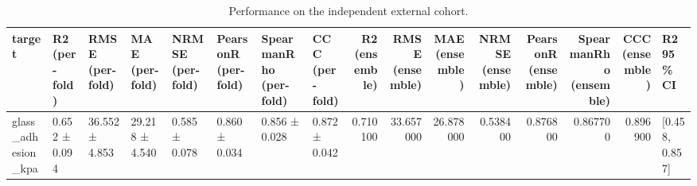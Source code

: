 \begin{table}
\caption{Performance on the independent external cohort.}
\label{tab:external_validation}
\begin{tabular}{llllllllrrrrrrrl}
\toprule
target & R2 (per-fold) & RMSE (per-fold) & MAE (per-fold) & NRMSE (per-fold) & PearsonR (per-fold) & SpearmanRho (per-fold) & CCC (per-fold) & R2 (ensemble) & RMSE (ensemble) & MAE (ensemble) & NRMSE (ensemble) & PearsonR (ensemble) & SpearmanRho (ensemble) & CCC (ensemble) & R2 95\% CI \\
\midrule
glass\_adhesion\_kpa & 0.652 ± 0.094 & 36.552 ± 4.853 & 29.218 ± 4.540 & 0.585 ± 0.078 & 0.860 ± 0.034 & 0.856 ± 0.028 & 0.872 ± 0.042 & 0.710100 & 33.657000 & 26.878000 & 0.538400 & 0.876800 & 0.867700 & 0.896900 & [0.458, 0.857] \\
\bottomrule
\end{tabular}
\end{table}
